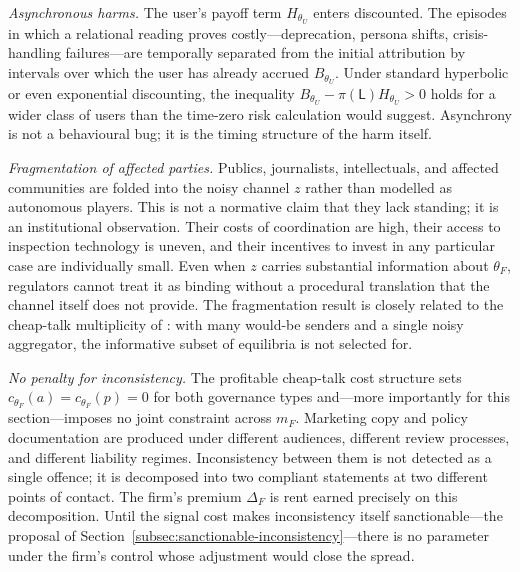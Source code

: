 \documentclass[review,authoryear]{elsarticle}
\theoremstyle{definition}
\theoremstyle{plain}
\begin{document}
\emph{Asynchronous harms.} The user's payoff term $H_{\theta_U}$ enters discounted. The episodes in which a relational reading proves costly---deprecation, persona shifts, crisis-handling failures---are temporally separated from the initial attribution by intervals over which the user has already accrued $B_{\theta_U}$. Under standard hyperbolic or even exponential discounting, the inequality $B_{\theta_U}-\pi(\mathsf{L})H_{\theta_U}>0$ holds for a wider class of users than the time-zero risk calculation would suggest. Asynchrony is not a behavioural bug; it is the timing structure of the harm itself.

\emph{Fragmentation of affected parties.} Publics, journalists, intellectuals, and affected communities are folded into the noisy channel $z$ rather than modelled as autonomous players. This is not a normative claim that they lack standing; it is an institutional observation. Their costs of coordination are high, their access to inspection technology is uneven, and their incentives to invest in any particular case are individually small. Even when $z$ carries substantial information about $\theta_F$, regulators cannot treat it as binding without a procedural translation that the channel itself does not provide. The fragmentation result is closely related to the cheap-talk multiplicity of \citet{crawford_sobel1982}: with many would-be senders and a single noisy aggregator, the informative subset of equilibria is not selected for.

\emph{No penalty for inconsistency.} The profitable cheap-talk cost structure sets $c_{\theta_F}(a)=c_{\theta_F}(p)=0$ for both governance types and---more importantly for this section---imposes no joint constraint across $m_F$. Marketing copy and policy documentation are produced under different audiences, different review processes, and different liability regimes. Inconsistency between them is not detected as a single offence; it is decomposed into two compliant statements at two different points of contact. The firm's premium $\Delta_F$ is rent earned precisely on this decomposition. Until the signal cost makes inconsistency itself sanctionable---the proposal of Section~\ref{subsec:sanctionable-inconsistency}---there is no parameter under the firm's control whose adjustment would close the spread.
\end{document}
